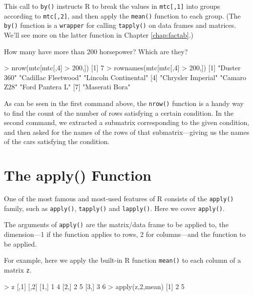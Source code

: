 This call to {\tt by()} instructs R to break the values in {\tt mtc[,1]}
into groups according to {\tt mtc[,2]}, and then apply the {\tt mean()}
function to each group.  (The {\tt by()} function is a {\tt wrapper} for
calling {\tt tapply()} on data frames and matrices.  We'll see more on
the latter function in Chapter \ref{chap:factab}.)

How many have more than 200 horsepower?  Which are they?

\begin{Code}
> nrow(mtc[mtc[,4] > 200,])
[1] 7
> rownames(mtc[mtc[,4] > 200,])
[1] "Duster 360"          "Cadillac Fleetwood"  "Lincoln Continental"
[4] "Chrysler Imperial"   "Camaro Z28"          "Ford Pantera L"     
[7] "Maserati Bora" 
\end{Code}

As can be seen in the first command above, the {\tt nrow()} function is
a handy way to find the count of the number of rows satisfying a certain
condition.  In the second command, we extracted a submatrix
corresponding to the given condition, and then asked for the names of
the rows of that submatrix---giving us the names of the cars satisfying
the condition.

\section{The apply() Function}
\label{apply}

One of the most famous and most-used features of R consists of 
the {\tt *apply()} family, such as {\tt apply()}, {\tt tapply()}
and {\tt lapply()}.  Here we cover {\tt apply()}.

The arguments of {\tt apply()} are the matrix/data frame to be applied
to, the dimension---1 if the function applies to rows, 2 for
columns---and the function to be applied.

For example, here we apply the built-in R function {\tt mean()} to each
column of a matrix {\tt z}.

\begin{Code}
> z
     [,1] [,2]
[1,]    1    4
[2,]    2    5
[3,]    3    6
> apply(z,2,mean)
[1] 2 5
\end{Code}

